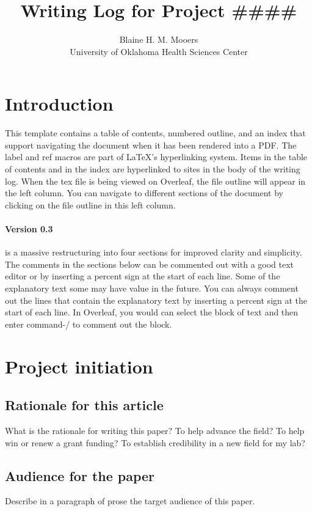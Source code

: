 \documentclass[10pt,letterpaper]{article}
\title{Writing Log for Project \#\#\#\#}
\author{Blaine H. M. Mooers \\University of Oklahoma Health Sciences Center}
\begin{document}
\maketitle
\tableofcontents


\section*{Introduction}


This template contains a table of contents, numbered outline, and an index that support navigating the document when it has been rendered into a PDF. 
The label and ref macros are part of LaTeX's hyperlinking system.
Items in the table of contents and in the index are hyperlinked to sites in the body of the writing log.
When the tex file is being viewed on Overleaf, the file outline will appear in the left column.
You can navigate to different sections of the document by clicking on the file outline in this left column.

\paragraph*{Version 0.3} is a massive restructuring into four sections for improved clarity and simplicity.
The comments in the sections below can be commented out with a good text editor or by inserting a percent sign at the start of each line.
Some of the explanatory text some may have value in the future.
You can always comment out the lines that contain the explanatory text by inserting a percent sign at the start of each line.
In Overleaf, you would can select the block of text and then enter command-/ to comment out the block.



\section{Project initiation}
\subsection{Rationale for this article}
\label{sub:why}

What is the rationale for writing this paper?
To help advance the field?
To help win or renew a grant funding?
To establish credibility in a new field for my lab?


\subsection{Audience for the paper}
\label{sub:audience}
Describe in a paragraph of prose the target audience of this paper.
\end{document}
